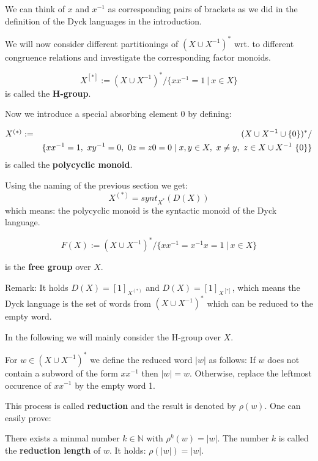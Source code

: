 We can think of $x$ and $x^{-1}$ as corresponding pairs of
brackets as we did in the definition of the Dyck languages in the introduction.

We will now consider different partitionings of $(X \cup X^{-1})^*$ wrt. to
different congruence relations and investigate the corresponding factor monoids.

\begin{definition}
\[ X^{[*]} := (X \cup X^{-1})^* / \{ x x^{-1} = 1\ |\ x \in X \} \]
is called the {\bf H-group}.
\end{definition}

Now we introduce a special absorbing element $0$ by defining:
\begin{definition}
\begin{eqnarray*}
\mbox{${X}^{(*)}$} & := & (X \cup X^{-1} \cup \{0\})^* / \\
& & \{ x x^{-1} = 1,\ x y^{-1} = 0,\ 0
z = z 0 = 0 \mid x,y \in X,\ x\neq y,\ z \in X \cup X^{-1} \ \{0\} \}
\end{eqnarray*}
is called the {\bf polycyclic monoid}.
\end{definition}

Using the naming of the previous section we get:
\[ X^{(*)} = synt_{X^*}(D(X)) \]
which means: the polycyclic monoid is the syntactic monoid of the Dyck language.

\begin{definition}
\[ F(X) := (X \cup X^{-1})^* / \{ x x^{-1} = x^{-1} x = 1 \ |\ x \in X \} \]
\end{definition}
is the {\bf free group} over $X$.

Remark: It holds $D(X) = [1]_{X^{(*)}}$ and $D(X) = [1]_{X^{[*]}}$, which means
the Dyck language is the set of words from $(X \cup X^{-1})^*$ which can be
reduced to the empty word.

In the following we will mainly consider the H-group over $X$.

For $w \in (X \cup X^{-1})^*$ we define the reduced word $|w|$ as follows: If
$w$ does not contain a subword of the form $x x^{-1}$ then $|w| = w$. Otherwise,
replace the leftmost occurence of $x x^{-1}$ by the empty word 1.

This process is called {\bf reduction} and the result is denoted by $\rho(w)$.
One can easily prove:

\begin{lemma}
There exists a minmal number $k \in \mathbb{N}$ with $\rho^k(w) = |w|$. The
number $k$ is called the {\bf reduction length} of $w$. It holds: $\rho(|w|) =
|w|$.
\end{lemma}

